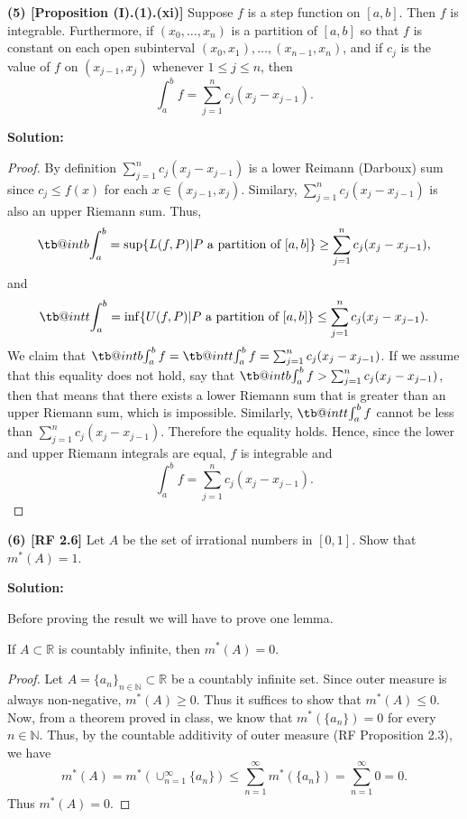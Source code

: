 \documentclass[12pt]{article}
\makeatletter
\newcommand\tint{\mathop{\mathpalette\tb@int{t}}\!\int}
\newcommand\bint{\mathop{\mathpalette\tb@int{b}}\!\int}
\newcommand\tb@int[2]{%
  \sbox\z@{$\m@th#1\int$}%
  \if#2t%
    \rlap{\hbox to\wd\z@{%
      \hfil
      \vrule width .35em height \dimexpr\ht\z@+1.4pt\relax depth -\dimexpr\ht\z@+1pt\relax
      \kern.05em %
    }}
  \else
    \rlap{\hbox to\wd\z@{%
      \vrule width .35em height -\dimexpr\dp\z@+1pt\relax depth \dimexpr\dp\z@+1.4pt\relax
      \hfil
    }}
  \fi
}
\makeatother
\begin{document}
{\bf (5) [Proposition (I).(1).(xi)]} Suppose $f$ is a step function on $[a,b]$.
Then $f$ is integrable. Furthermore, if $(x_{0}, \dots, x_{n})$ is a partition
of $[a,b]$ so that $f$ is constant on each open subinterval $(x_{0}, x_{1}),
\dots, (x_{n-1}, x_{n})$, and if $c_{j}$ is the value of $f$ on $(x_{j-1},
x_{j})$ whenever $1 \leq j \leq n$, then 
\[ \int_{a}^{b} f = \sum_{j=1}^{n}c_{j}(x_{j} - x_{j-1}). \]

{\bf Solution:}

\begin{proof}
  By definition $\sum_{j=1}^{n}c_{j}(x_{j}- x_{j-1})$ is a lower Reimann
  (Darboux) sum since $c_{j} \leq f(x)$ for each $x \in (x_{j-1}, x_{j})$.
  Similary, $\sum_{j=1}^{n}c_{j}(x_{j} - x_{j-1})$ is also an upper Riemann sum.
  Thus, 
  \[ \bint_{a}^{b} = \sup\{L(f,P) | P \text{ a partition of
  }[a,b]\} \geq \sum_{j=1}^{n}c_{j}(x_{j} - x_{j-1}), \]
  and
  \[ \tint_{a}^{b} = \inf\{U(f,P) | P \text{ a partition of }[a,b]\}
\leq \sum_{j=1}^{n}c_{j}(x_{j} - x_{j-1}). \]
  We claim that $\bint_{a}^{b}f = \tint_{a}^{b}f =
  \sum_{j=1}^{n}c_{j}(x_{j} - x_{j-1})$. If we assume that this equality does
  not hold, say that $\bint_{a}^{b}f >
  \sum_{j=1}^{n}c_{j}(x_{j}-x_{j-1})$, then that means that there exists a lower
  Riemann sum that is greater than an upper Riemann sum, which is impossible.
  Similarly, $\tint_{a}^{b} f$ cannot be less than
  $\sum_{j=1}^{n}c_{j}(x_{j}- x_{j-1})$. Therefore the equality holds. Hence,
  since the lower and upper Riemann integrals are equal, $f$ is integrable and 
  \[ \int_{a}^{b}f = \sum_{j=1}^{n}c_{j}(x_{j} - x_{j-1}). \]
\end{proof}

{\bf (6) [RF 2.6]} Let $A$ be the set of irrational numbers in $[0,1]$. Show
that $m^{*}(A) = 1$.

{\bf Solution:}

Before proving the result we will have to prove one lemma.
\begin{Lemma}
If $A \subset \mathbb{R}$ is countably infinite, then $m^{*}(A) = 0$.
\end{Lemma}
\begin{proof}
Let $A = \{a_{n}\}_{n\in\mathbb{N}} \subset \mathbb{R}$ be a countably infinite
set. Since outer measure is always non-negative, $m^{*}(A) \geq 0$. Thus it
suffices to show that $m^{*}(A) \leq 0$. Now, from a theorem proved in class, we
know that $m^{*}(\{a_{n}\}) = 0$ for every $n \in \mathbb{N}$. Thus, by the
countable additivity of outer measure (RF Proposition 2.3), we have 
\[ m^{*}(A) = m^{*}(\cup_{n=1}^{\infty}\{a_{n}\}) \leq
\sum_{n=1}^{\infty}m^{*}(\{a_{n}\}) = \sum_{n=1}^{\infty}0 = 0.\]
Thus $m^{*}(A) = 0$.
\end{proof}
\end{document}
